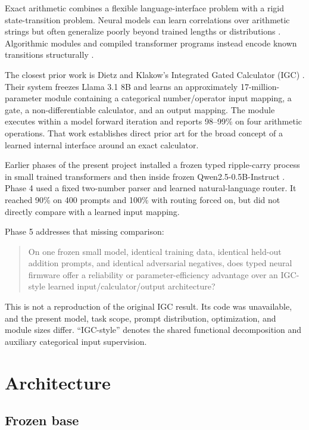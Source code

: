 \documentclass[11pt]{article}
\begin{document}
Exact arithmetic combines a flexible language-interface problem with a rigid
state-transition problem. Neural models can learn correlations over arithmetic
strings but often generalize poorly beyond trained lengths or distributions
\cite{trask2018,jelassi2023,cho2024}. Algorithmic modules and compiled
transformer programs instead encode known transitions structurally
\cite{lindner2023,bounsi2024}.

The closest prior work is Dietz and Klakow's Integrated Gated Calculator
(IGC) \cite{dietz2025}. Their system freezes Llama 3.1 8B and learns an
approximately 17-million-parameter module containing a categorical
number/operator input mapping, a gate, a non-differentiable calculator, and an
output mapping. The module executes within a model forward iteration and
reports 98--99\% on four arithmetic operations. That work establishes direct
prior art for the broad concept of a learned internal interface around an
exact calculator.

Earlier phases of the present project installed a frozen typed ripple-carry
process in small trained transformers and then inside frozen
Qwen2.5-0.5B-Instruct \cite{qwen2024}. Phase 4 used a fixed two-number parser
and learned natural-language router. It reached 90\% on 400 prompts and 100\%
with routing forced on, but did not directly compare with a learned input
mapping.

Phase 5 addresses that missing comparison:

\begin{quote}
On one frozen small model, identical training data, identical held-out
addition prompts, and identical adversarial negatives, does typed neural
firmware offer a reliability or parameter-efficiency advantage over an
IGC-style learned input/calculator/output architecture?
\end{quote}

This is not a reproduction of the original IGC result. Its code was
unavailable, and the present model, task scope, prompt distribution,
optimization, and module sizes differ. ``IGC-style'' denotes the shared
functional decomposition and auxiliary categorical input supervision.

\section{Architecture}

\subsection{Frozen base}
\end{document}
